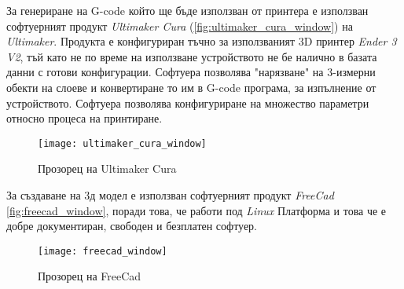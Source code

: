 За генериране на G-code който ще бъде използван от принтера е използван софтуерният продукт
\textit{Ultimaker Cura} (\autoref{fig:ultimaker_cura_window}) на \textit{Ultimaker}.
Продукта е конфигуриран тъчно за използваният 3D принтер \textit{Ender 3 V2}, тъй като не по време на използване устройството не бе налично
в базата данни с готови конфигурации. Софтуера позволява "нарязване" на 3-измерни обекти на слоеве и конвертиране то им в G-code програма, за изпълнение от
устройството. Софтуера позволява конфигуриране на множество параметри относно процеса на принтиране.

\begin{figure}[htpb!]
    \centering
    \texttt{[image: ultimaker\_cura\_window]}
    \caption{Прозорец на Ultimaker Cura}
    \label{fig:ultimaker_cura_window}
\end{figure}

За създаване на 3д модел е използван софтуерният продукт \textit{FreeCad} \autoref{fig:freecad_window},
поради това, че работи под \textit{Linux} Платформа и това че е добре документиран, свободен и безплатен софтуер.

\begin{figure}[htpb!]
    \centering
    \texttt{[image: freecad\_window]}
    \caption{Прозорец на FreeCad}
    \label{fig:freecad_window}
\end{figure}

\FloatBarrier




